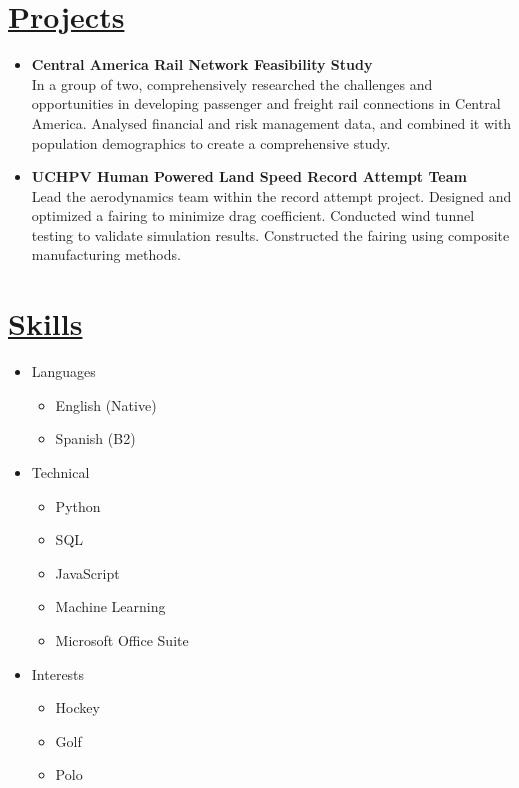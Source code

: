 \documentclass[a4paper,10pt]{article}
\begin{document}
\section*{\uline{Projects}}
\begin{itemize}
    \item \textbf{Central America Rail Network Feasibility Study} \\
    In a group of two, comprehensively researched the challenges and opportunities in developing passenger and freight rail connections in Central America.
    Analysed financial and risk management data, and combined it with population demographics to create a comprehensive study. 
    \item \textbf{UCHPV Human Powered Land Speed Record Attempt Team} \\
    Lead the aerodynamics team within the record attempt project.
    Designed and optimized a fairing to minimize drag coefficient.
    Conducted wind tunnel testing to validate simulation results.
    Constructed the fairing using composite manufacturing methods.
\end{itemize}

\section*{\uline{Skills}}
\begin{itemize}
    \item Languages
    \begin{itemize}
        \item English (Native)
        \item Spanish (B2)
    \end{itemize}
    \item Technical
    \begin{itemize}
        \item Python
        \item SQL
        \item JavaScript
        \item Machine Learning
        \item Microsoft Office Suite
    \end{itemize}
    \item Interests
    \begin{itemize}
        \item Hockey
        \item Golf
        \item Polo
    \end{itemize}
\end{itemize}
\end{document}
